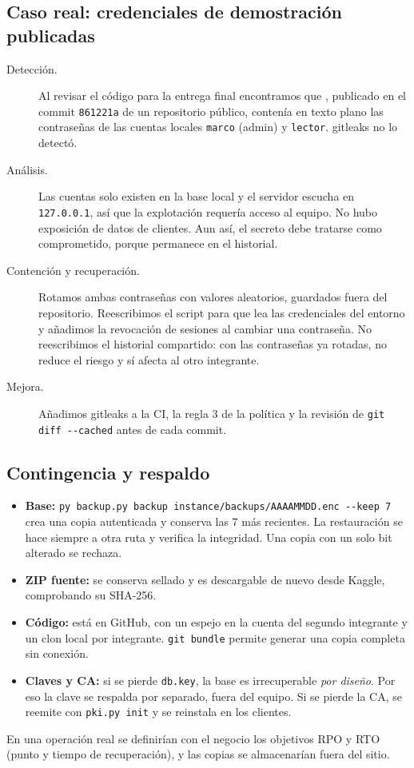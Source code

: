 \documentclass[12pt,a4paper]{article}
\begin{document}
\subsection{Caso real: credenciales de demostración publicadas}
\label{sec:incidente-real}
\begin{description}
\item[Detección.] Al revisar el código para la entrega final encontramos que , publicado en el commit \texttt{861221a} de un repositorio público, contenía en texto plano las contraseñas de las cuentas locales \texttt{marco} (admin) y \texttt{lector}. gitleaks no lo detectó.
\item[Análisis.] Las cuentas solo existen en la base local y el servidor escucha en \texttt{127.0.0.1}, así que la explotación requería acceso al equipo. No hubo exposición de datos de clientes. Aun así, el secreto debe tratarse como comprometido, porque permanece en el historial.
\item[Contención y recuperación.] Rotamos ambas contraseñas con valores aleatorios, guardados fuera del repositorio. Reescribimos el script para que lea las credenciales del entorno y añadimos la revocación de sesiones al cambiar una contraseña. No reescribimos el historial compartido: con las contraseñas ya rotadas, no reduce el riesgo y sí afecta al otro integrante.
\item[Mejora.] Añadimos gitleaks a la CI, la regla 3 de la política y la revisión de \texttt{git diff -{}-cached} antes de cada commit.
\end{description}

\subsection{Contingencia y respaldo}
\begin{itemize}
\item \textbf{Base:} \texttt{py backup.py backup instance/backups/AAAAMMDD.enc -{}-keep 7} crea una copia autenticada y conserva las 7 más recientes. La restauración se hace siempre a otra ruta y verifica la integridad. Una copia con un solo bit alterado se rechaza.
\item \textbf{ZIP fuente:} se conserva sellado y es descargable de nuevo desde Kaggle, comprobando su SHA-256.
\item \textbf{Código:} está en GitHub, con un espejo en la cuenta del segundo integrante y un clon local por integrante. \texttt{git bundle} permite generar una copia completa sin conexión.
\item \textbf{Claves y CA:} si se pierde \texttt{db.key}, la base es irrecuperable \emph{por diseño}. Por eso la clave se respalda por separado, fuera del equipo. Si se pierde la CA, se reemite con \texttt{pki.py init} y se reinstala en los clientes.
\end{itemize}
En una operación real se definirían con el negocio los objetivos RPO y RTO (punto y tiempo de recuperación), y las copias se almacenarían fuera del sitio.
\end{document}
